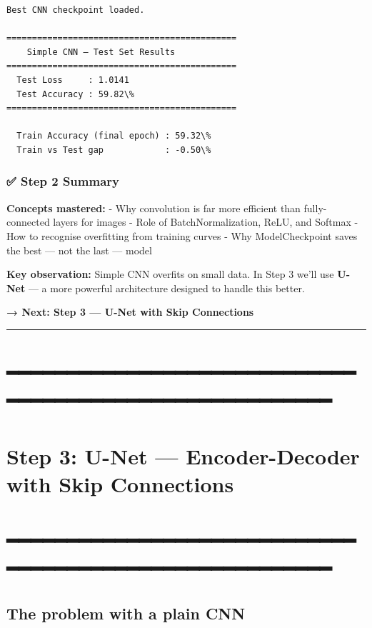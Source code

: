 \documentclass[11pt]{article}
\begin{document}
    \begin{Verbatim}[commandchars=\\\{\}]
Best CNN checkpoint loaded.

=============================================
    Simple CNN — Test Set Results
=============================================
  Test Loss     : 1.0141
  Test Accuracy : 59.82\%
=============================================

  Train Accuracy (final epoch) : 59.32\%
  Train vs Test gap            : -0.50\%
    \end{Verbatim}

    \subsubsection{✅ Step 2 Summary}\label{step-2-summary}

\textbf{Concepts mastered:} - Why convolution is far more efficient than
fully-connected layers for images - Role of BatchNormalization, ReLU,
and Softmax - How to recognise overfitting from training curves - Why
ModelCheckpoint saves the best --- not the last --- model

\textbf{Key observation:} Simple CNN overfits on small data. In Step 3
we'll use \textbf{U-Net} --- a more powerful architecture designed to
handle this better.

\textbf{→ Next: Step 3 --- U-Net with Skip Connections}

    \begin{center}\rule{0.5\linewidth}{0.5pt}\end{center}

\section{━━━━━━━━━━━━━━━━━━━━━━━━━━━━━━━━━━━━━━━━━━━━━━━━━━━━━━━━}

\section{Step 3: U-Net --- Encoder-Decoder with Skip
Connections}\label{step-3-u-net-encoder-decoder-with-skip-connections}

\section{━━━━━━━━━━━━━━━━━━━━━━━━━━━━━━━━━━━━━━━━━━━━━━━━━━━━━━━━}

\subsection{The problem with a plain
CNN}
\end{document}
